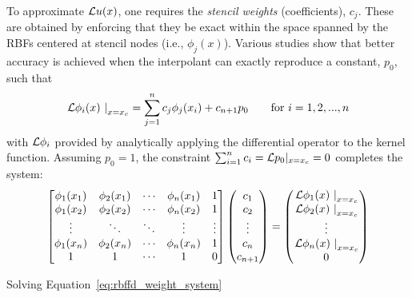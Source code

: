 \documentclass[11pt]{report}
\begin{document}
{ To approximate $\mathcal{L}u(x)$, one requires the \emph{stencil weights} (coefficients), ${c_j}$. These are obtained by enforcing that they be exact within the space spanned by the RBFs centered at stencil nodes (i.e., $\phi_j(x)$). Various studies  \cite{WrightFornberg06,FornbergDriscoll02,FornbergLehto11,FlyerLehto11} show that better accuracy is achieved when the 
interpolant can exactly reproduce a constant, $p_0$, such that	\begin{align}
	       \left. \mathcal{L}\phi_i(x) \ \right|_{x=x_c} = \sum_{j=1}^{n} c_j \phi_j(x_i) + c_{n+1} p_0 \ \ \ \ \ \ \textrm{for }i=1,2,...,n \nonumber 
	\end{align}
with $\mathcal{L}\phi_i$ provided by analytically applying the differential operator to the kernel function. Assuming $p_0 = 1$, the constraint $\sum_{i=1}^{n}c_i=\mathcal{L}p_0|_{x=x_{c}}=0$ completes the system: 
	\begin{eqnarray}        
          \begin{bmatrix} \phi_1(x_1) & \phi_2(x_1) & \cdots & \phi_n(x_{1}) & 1 \\ 
            \phi_1(x_2) & \phi_2(x_2) & \cdots & \phi_n(x_{2}) & 1\\ 
            \vdots & \ddots & \ddots & \vdots & \vdots \\ 
            \phi_{1}(x_n) & \phi_{2}(x_n) & \cdots & \phi_{n}(x_{n}) & 1 
            \\ 1 & 1 & \cdots & 1 & 0 \end{bmatrix} 
            \begin{pmatrix} c_1 \\ c_2 \\ \vdots \\ c_n \\ c_{n+1} \end{pmatrix} = \begin{pmatrix} \left.\diffop{\phi_1}(x)\ \right|_{x=x_c} \\  \left.\diffop{\phi_2}(x)\ \right|_{x=x_c} \\ \vdots \\  \left.\diffop{\phi_{n}}(x)\ \right|_{x=x_c} \\ 0 \end{pmatrix} \label{eq:rbffd_two_weight_system}
   \end{eqnarray} 

Solving Equation~\ref{eq:rbffd_weight_system}



}
\end{document}
